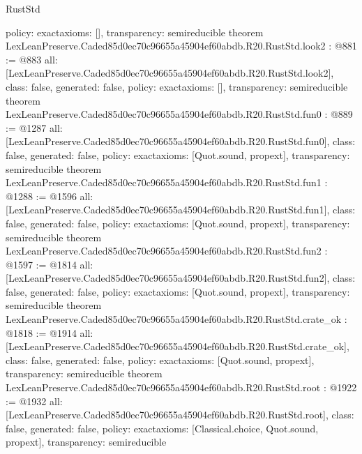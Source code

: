 \begin{lexlean}{RustStd}
\begin{coremodule}
{  policy: exact{axioms: []},
  transparency: semireducible
}
theorem LexLeanPreserve.Caded85d0ec70c96655a45904ef60abdb.R20.RustStd.look2 : @881 := @883 {
  all: [LexLeanPreserve.Caded85d0ec70c96655a45904ef60abdb.R20.RustStd.look2],
  class: false,
  generated: false,
  policy: exact{axioms: []},
  transparency: semireducible
}
theorem LexLeanPreserve.Caded85d0ec70c96655a45904ef60abdb.R20.RustStd.fun0 : @889 := @1287 {
  all: [LexLeanPreserve.Caded85d0ec70c96655a45904ef60abdb.R20.RustStd.fun0],
  class: false,
  generated: false,
  policy: exact{axioms: [Quot.sound, propext]},
  transparency: semireducible
}
theorem LexLeanPreserve.Caded85d0ec70c96655a45904ef60abdb.R20.RustStd.fun1 : @1288 := @1596 {
  all: [LexLeanPreserve.Caded85d0ec70c96655a45904ef60abdb.R20.RustStd.fun1],
  class: false,
  generated: false,
  policy: exact{axioms: [Quot.sound, propext]},
  transparency: semireducible
}
theorem LexLeanPreserve.Caded85d0ec70c96655a45904ef60abdb.R20.RustStd.fun2 : @1597 := @1814 {
  all: [LexLeanPreserve.Caded85d0ec70c96655a45904ef60abdb.R20.RustStd.fun2],
  class: false,
  generated: false,
  policy: exact{axioms: [Quot.sound, propext]},
  transparency: semireducible
}
theorem LexLeanPreserve.Caded85d0ec70c96655a45904ef60abdb.R20.RustStd.crate_ok : @1818 := @1914 {
  all: [LexLeanPreserve.Caded85d0ec70c96655a45904ef60abdb.R20.RustStd.crate_ok],
  class: false,
  generated: false,
  policy: exact{axioms: [Quot.sound, propext]},
  transparency: semireducible
}
theorem LexLeanPreserve.Caded85d0ec70c96655a45904ef60abdb.R20.RustStd.root : @1922 := @1932 {
  all: [LexLeanPreserve.Caded85d0ec70c96655a45904ef60abdb.R20.RustStd.root],
  class: false,
  generated: false,
  policy: exact{axioms: [Classical.choice, Quot.sound, propext]},
  transparency: semireducible
}


\end{coremodule}
\end{lexlean}
